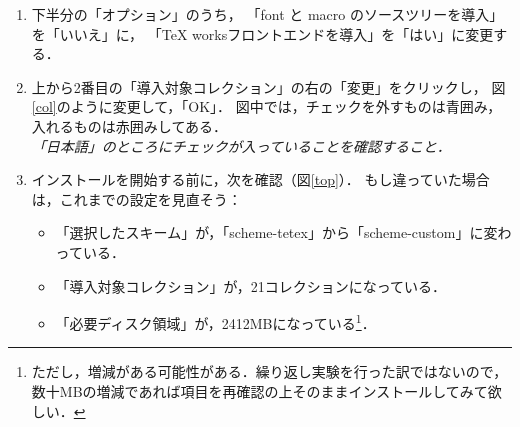 \documentclass{ltjsarticle}
\begin{document}
\begin{enumerate}
  まず，インストーラの一番上にある
  「{選択したスキーム}」の右の「変更」をクリックし，
  「{scheme-tetex}」を選択
  \footnote{%
    ちなみに，\href{http://www.tug.org/tetex/}{te\TeX}というのは，
    Thomas Esser氏がメンテナンスをしていた，UNIX系OSのための\TeX システムである．
    以前は広く用いられてきたが，2006年に更新停止となった．
  }，「OK」．

\item 下半分の「オプション」のうち，
  「font と macro のソースツリーを導入」を「いいえ」に，
  「TeX worksフロントエンドを導入」を「はい」に変更する．

\item 上から2番目の「導入対象コレクション」の右の「変更」をクリックし，
  図\nobreak\ref{col}のように変更して，「OK」．
  図中では，チェックを外すものは青囲み，入れるものは赤囲みしてある．\\
  \emph{「日本語」のところにチェックが入っていることを確認すること．}

\item インストールを開始する前に，次を確認（図\nobreak\ref{top}）．
  もし違っていた場合は，これまでの設定を見直そう：
  \begin{itemize}
  \item 「選択したスキーム」が，「scheme-tetex」から「scheme-custom」に変わっている．
  \item 「導入対象コレクション」が，21コレクションになっている．
  \item 「必要ディスク領域」が，2412MBになっている\footnote{%
      ただし，増減がある可能性がある．繰り返し実験を行った訳ではないので，
      数十MBの増減であれば項目を再確認の上そのままインストールしてみて欲しい．}．
  \end{itemize}


\end{enumerate}
\end{document}
